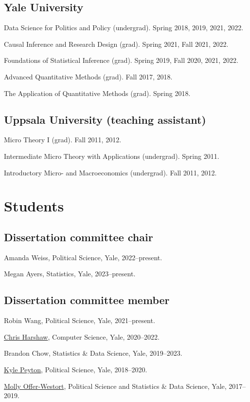 \documentclass[10pt,letterpaper]{article}
\newenvironment{infolist}{
	\begin{list}{}{
		\setlength{\parskip}{0pt}
		\setlength{\itemsep}{4pt}
		\setlength{\parsep}{0.3em}
		\setlength{\leftmargin}{0em}
		\setlength{\labelwidth}{0em}
		}
	}{
\end{list}
}
\newcommand{\infoitem}[1]{\item {#1}}
\begin{document}
	\subsection*{Yale University}

	\begin{infolist}
		\infoitem{Data Science for Politics and Policy (undergrad). Spring 2018, 2019, 2021, 2022.}
		\infoitem{Causal Inference and Research Design (grad). Spring 2021, Fall 2021, 2022.}
		\infoitem{Foundations of Statistical Inference (grad). Spring 2019, Fall 2020, 2021, 2022.}
		\infoitem{Advanced Quantitative Methods (grad). Fall 2017, 2018.}
		\infoitem{The Application of Quantitative Methods (grad). Spring 2018.}
	\end{infolist}

	\subsection*{Uppsala University (teaching assistant)}

	\begin{infolist}
		\infoitem{Micro Theory I (grad). Fall 2011, 2012.}
		\infoitem{Intermediate Micro Theory with Applications (undergrad). Spring 2011.}
		\infoitem{Introductory Micro- and Macroeconomics (undergrad). Fall 2011, 2012.}
	\end{infolist}


	\section*{Students}

	\subsection*{Dissertation committee chair}

	\begin{infolist}
		\infoitem{Amanda Weiss, Political Science, Yale, 2022--present.}
		\infoitem{Megan Ayers, Statistics, Yale, 2023--present.}
	\end{infolist}

	\subsection*{Dissertation committee member}

	\begin{infolist}
		\infoitem{Robin Wang, Political Science, Yale, 2021--present.}
		\infoitem{\href{http://www.chrisharshaw.com/}{Chris Harshaw}, Computer Science, Yale, 2020--2022.}
		\infoitem{Brandon Chow, Statistics \& Data Science, Yale, 2019--2023.}
		\infoitem{\href{https://kylepeyton.github.io}{Kyle Peyton}, Political Science, Yale, 2018--2020.}
		\infoitem{\href{https://mollyow.github.io}{Molly Offer-Westort}, Political Science and Statistics \& Data Science, Yale, 2017--2019.}
	\end{infolist}
\end{document}
